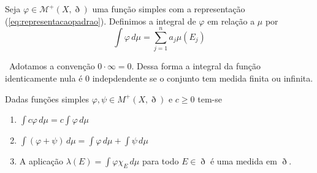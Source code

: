 \documentclass[a4paper, 11pt]{book}
\theoremstyle{definition}
\newcommand{\obs}{\noindent{\textbf{\textcolor{black}{\sffamily Observação:}}}~}
\newcommand{\cM}{\mathcal{M}}
\begin{document}
\begin{dbox}
    Seja $\varphi \in \cM^+(X,\eth)$ uma função simples com a representação (\ref{eq:representacaopadrao}). Definimos a integral de $\varphi$ em relação a $\mu$ por
    \begin{equation*}
        \int \varphi \, d\mu = \sum_{j=1}^n a_j \mu(E_j)
    \end{equation*}
\end{dbox}

\obs Adotamos a convenção $0 \cdot \infty = 0$. Dessa forma a integral da função identicamente nula é $0$ indepdendente se o conjunto tem medida finita ou infinita.

\begin{lbox} \label{lm:propiedades-elementares-simples}
    Dadas funções simples $\varphi, \psi \in M^+(X, \eth)$ e $c \geqslant 0$ tem-se
    \begin{enumerate}[leftmargin=*, label=\textbf{(\alph*)}]
        \item $\displaystyle \int c \varphi \, d\mu = c \int \varphi \, d\mu$
        \item $\displaystyle \int (\varphi + \psi) \, d\mu = \int \varphi \,d\mu + \int \psi \, d\mu$
        \item A aplicação
        $\displaystyle \lambda(E) = \int \varphi \chi_E \, d\mu$
        para todo $E \in \eth$ é uma medida em $\eth$.
    \end{enumerate}
\end{lbox}
\end{document}
